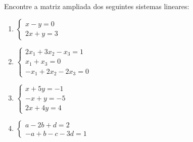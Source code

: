 \documentclass[12pt]{exam}
\begin{document}
\begin{exercicio}
  Encontre a matriz ampliada dos seguintes sistemas lineares:
  \begin{enumerate}[label={\alph*})]
    \item $\begin{cases}x - y = 0\\2x + y = 3\end{cases}$
    \item $\begin{cases}2x_1 + 3x_2 - x_3 = 1\\x_1 + x_3 = 0\\-x_1 + 2x_2 - 2x_3 = 0\end{cases}$
    \item $\begin{cases}x + 5y = -1\\-x + y = -5\\2x + 4y = 4\end{cases}$
    \item $\begin{cases}a - 2b + d = 2\\-a + b - c - 3d = 1\end{cases}$
  \end{enumerate}
\end{exercicio}
\end{document}
